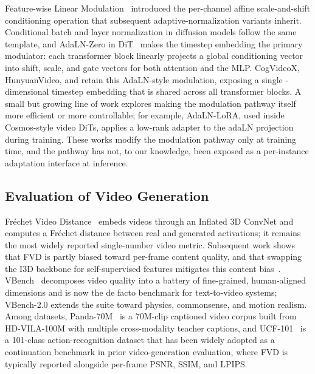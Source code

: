 Feature-wise Linear Modulation~\citep{perez2018film} introduced the
per-channel affine scale-and-shift conditioning operation that subsequent
adaptive-normalization variants inherit. Conditional batch and layer
normalization in diffusion models follow the same template, and AdaLN-Zero
in DiT~\citep{peebles2023dit} makes the timestep embedding the primary
modulator: each transformer block linearly projects a global conditioning
vector into shift, scale, and gate vectors for both attention and the MLP.
CogVideoX, HunyuanVideo, and \backbone retain this AdaLN-style modulation,
exposing a single \dimt-dimensional timestep embedding that is shared
across all transformer blocks. A small but growing line of work explores
making the modulation pathway itself more efficient or more controllable;
for example, AdaLN-LoRA, used inside Cosmos-style video DiTs, applies a
low-rank adapter to the adaLN projection during training. These works
modify the modulation pathway only at training time, and the pathway has
not, to our knowledge, been exposed as a per-instance adaptation interface
at inference.

\subsection{Evaluation of Video Generation}
\label{sec:rw_eval}

Fr\'echet Video Distance~\citep{unterthiner2018fvd} embeds videos through
an Inflated 3D ConvNet and computes a Fr\'echet distance between real and
generated activations; it remains the most widely reported single-number
video metric. Subsequent work shows that FVD is partly biased toward
per-frame content quality, and that swapping the I3D backbone for
self-supervised features mitigates this content
bias~\citep{ge2024contentdebiasedFVD}.
VBench~\citep{huang2024vbench} decomposes video quality into a battery of
fine-grained, human-aligned dimensions and is now the de facto benchmark
for text-to-video systems; VBench-2.0 extends the suite toward physics,
commonsense, and motion realism. Among datasets,
Panda-70M~\citep{chen2024panda70m} is a 70M-clip captioned video corpus
built from HD-VILA-100M with multiple cross-modality teacher captions, and
UCF-101~\citep{soomro2012ucf101} is a 101-class action-recognition dataset
that has been widely adopted as a continuation benchmark in prior
video-generation evaluation, where FVD is typically reported alongside
per-frame PSNR, SSIM, and LPIPS.

